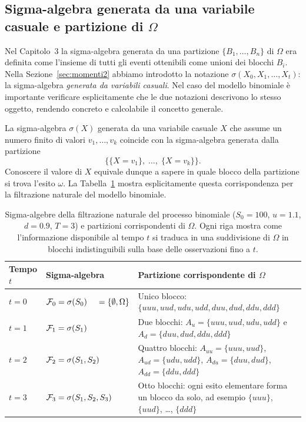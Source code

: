 \subsection{Sigma-algebra generata da una variabile casuale
e partizione di $\Omega$}

\noindent
Nel Capitolo~3 la sigma-algebra generata da una partizione
$\{B_1,\ldots,B_n\}$ di $\Omega$ era definita come l'insieme di tutti
gli eventi ottenibili come unioni dei blocchi $B_i$. Nella
Sezione~\ref{sec:momenti2} abbiamo introdotto la notazione
$\sigma(X_0,X_1,\ldots,X_t)$: la sigma-algebra \emph{generata da
variabili casuali}. Nel caso del modello binomiale \`{e} importante
verificare esplicitamente che le due notazioni descrivono lo stesso
oggetto, rendendo concreto e calcolabile il concetto generale.

La sigma-algebra $\sigma(X)$ generata da una variabile casuale $X$
che assume un numero finito di valori $v_1,\ldots,v_k$ coincide con
la sigma-algebra generata dalla partizione
\[
\bigl\{\{X=v_1\},\;\ldots,\;\{X=v_k\}\bigr\}.
\]
Conoscere il valore di $X$ equivale dunque a sapere in quale blocco
della partizione si trova l'esito $\omega$. La
Tabella~\ref{tab:sigma-partizione} mostra esplicitamente questa
corrispondenza per la filtrazione naturale del modello binomiale.

\begin{table}[ht]
\centering
\begin{tabular}{|p{1.2cm}|p{3.0cm}|p{6.2cm}|}
\hline
\textbf{Tempo} $t$ & \textbf{Sigma-algebra} & \textbf{Partizione
corrispondente di $\Omega$}\\
\hline
$t=0$ & $\F_0=\sigma(S_0) 
\newline \hspace*{0.4cm} =\{ \emptyset,\Omega\}$ &
Unico blocco: \newline $\{uuu,uud,udu,udd,duu,dud,ddu,ddd\}$\\
\hline
$t=1$ & $\mathcal{F}_1=\sigma(S_1)$ &
Due blocchi: \newline $A_u=\{uuu,uud,udu,udd\}$ e \newline
$A_d=\{duu,dud,ddu,ddd\}$\\
\hline
$t=2$ & $\mathcal{F}_2=\sigma(S_1,S_2)$ &
Quattro blocchi: $A_{uu}=\{uuu,uud\}$,
$A_{ud}=\{udu,udd\}$,
$A_{du}=\{duu,dud\}$,
$A_{dd}=\{ddu,ddd\}$\\
\hline
$t=3$ & $\mathcal{F}_3=\sigma(S_1,S_2,S_3)$ &
Otto blocchi: ogni esito elementare forma un blocco
da solo, ad esempio $\{uuu\}$, $\{uud\}$, \ldots,
$\{ddd\}$\\
\hline
\end{tabular}
\caption{Sigma-algebre della filtrazione naturale del processo
binomiale ($S_0=100$, $u=1.1$, $d=0.9$, $T=3$) e partizioni
corrispondenti di $\Omega$. Ogni riga mostra come l'informazione
disponibile al tempo $t$ si traduca in una suddivisione di
$\Omega$ in blocchi indistinguibili sulla base delle osservazioni
fino a $t$.}
\label{tab:sigma-partizione}
\end{table}

